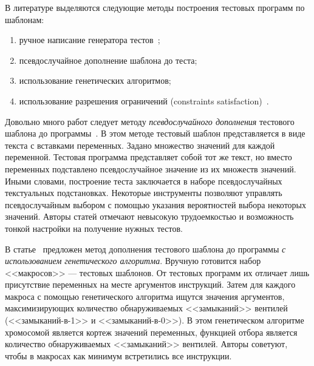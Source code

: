 \documentclass[14pt]{extreport}
\begin{document}
В литературе выделяются следующие методы построения тестовых программ по шаблонам:
\begin{enumerate}
	\item ручное написание генератора тестов~\cite{MicroTESK};
	\item псевдослучайное дополнение шаблона до теста;
	\item использование генетических алгоритмов;
	\item использование разрешения ограничений (constraints satisfaction)~\cite{CLPusingECLiPSe}.
\end{enumerate}

Довольно много работ следует методу \emph{псевдослучайного дополнения} тестового шаблона до программы~\cite{SEGUE1, SEGUE2, PA-RISC, TSE, Theo, mVpGen}. В этом методе тестовый шаблон представляется в виде текста с вставками переменных. Задано множество значений для каждой переменной. Тестовая программа представляет собой тот же текст, но вместо переменных подставлено псевдослучайное значение из их множеств значений. Иными словами, построение теста заключается в наборе псевдослучайных текстуальных подстановках. Некоторые инструменты позволяют управлять псевдослучайным выбором с помощью указания вероятностей выбора некоторых значений. Авторы статей отмечают невысокую трудоемкостью и возможность тонкой настройки на получение нужных тестов.

В статье~\cite{GeneticTemplates} предложен метод дополнения тестового шаблона до программы \emph{с использованием генетического алгоритма}. Вручную готовится набор <<макросов>> --- тестовых шаблонов. От тестовых программ их отличает лишь присутствие переменных на месте аргументов инструкций. Затем для каждого макроса с помощью генетического алгоритма ищутся значения аргументов, максимизирующих количество обнаруживаемых <<замыканий>> вентилей (<<замыканий-в-1>> и <<замыканий-в-0>>). В этом генетическом алгоритме хромосомой является кортеж значений переменных, функцией отбора является количество обнаруживаемых <<замыканий>> вентилей. Авторы советуют, чтобы в макросах как минимум встретились все инструкции.

\end{document}
